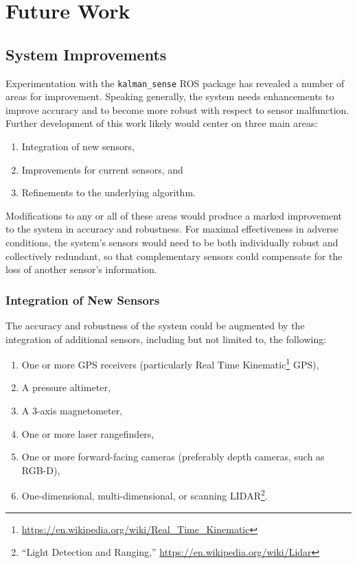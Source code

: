 \chapter{Future Work}

\section{System Improvements}

Experimentation with the \texttt{kalman\_sense} ROS package has revealed a number of areas for improvement. Speaking generally, the system needs enhancements to improve accuracy and to become more robust with respect to sensor malfunction. Further development of this work likely would center on three main areas:
\begin{enumerate}
    \item Integration of new sensors,
    \item Improvements for current sensors, and
    \item Refinements to the underlying algorithm.
\end{enumerate}
Modifications to any or all of these areas would produce a marked improvement to the system in accuracy and robustness. For maximal effectiveness in adverse conditions, the system's sensors would need to be both individually robust and collectively redundant, so that complementary sensors could compensate for the loss of another sensor's information.

\subsection{Integration of New Sensors}
The accuracy and robustness of the system could be augmented by the integration of additional sensors, including but not limited to, the following:
\begin{enumerate}
    \item One or more GPS receivers (particularly Real Time Kinematic\footnote{\url{https://en.wikipedia.org/wiki/Real_Time_Kinematic}} GPS),
    \item A pressure altimeter,
    \item A 3-axis magnetometer,
    \item One or more laser rangefinders,
    \item One or more forward-facing cameras (preferably depth cameras, such as RGB-D),
    \item One-dimensional, multi-dimensional, or scanning LIDAR\footnote{``Light Detection and Ranging,'' \url{https://en.wikipedia.org/wiki/Lidar}}.
\end{enumerate}

